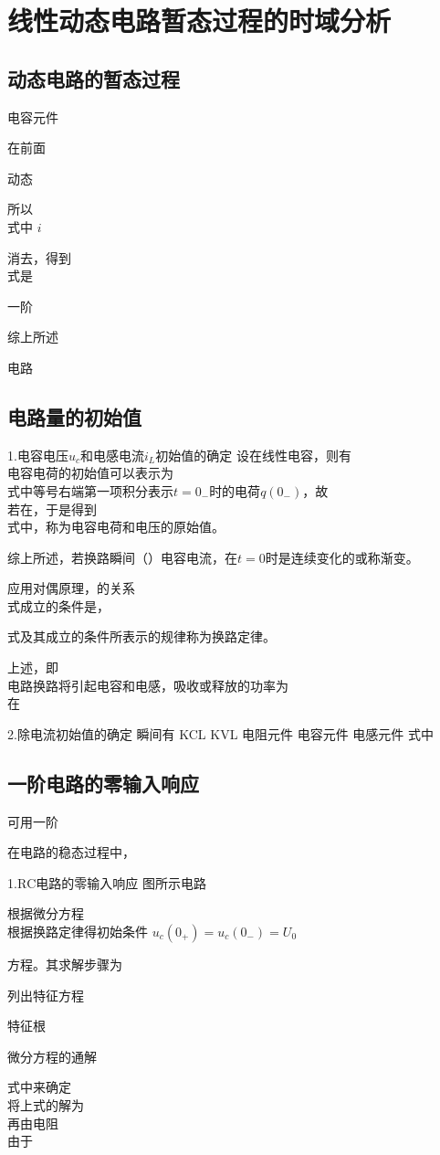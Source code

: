\chapter{线性动态电路暂态过程的时域分析}

\section{动态电路的暂态过程}
电容元件

在前面

动态

所以
\[
\]
式中    $i$

消去，得到
\[
\]
式是

一阶

综上所述

电路

\section{电路量的初始值}
1.电容电压$u_c$和电感电流$i_L$初始值的确定
设在线性电容，则有
\[
\]
电容电荷的初始值可以表示为
\[
\]
式中等号右端第一项积分表示$t=0_-$时的电荷$q(0_-)$，故
\[
\]
若在，于是得到
\[
\]
式中，称为电容电荷和电压的原始值。

综上所述，若换路瞬间（）电容电流，在$t=0$时是连续变化的或称渐变。

应用对偶原理，的关系
\[
\]
式成立的条件是，

式及其成立的条件所表示的规律称为换路定律。

上述，即
\[
\]
电路换路将引起电容和电感，吸收或释放的功率为
\[
\]
在

2.除电流初始值的确定
瞬间有
 KCL
 KVL
 电阻元件
 电容元件
 电感元件
式中

\section{一阶电路的零输入响应}
可用一阶

在电路的稳态过程中，

1.$\mathrm{RC}$电路的零输入响应
图所示电路

根据微分方程
\[
\]
根据换路定律得初始条件    $u_c(0_+)=u_c(0_-)=U_0$

方程。其求解步骤为

列出特征方程

特征根

微分方程的通解

式中来确定
\[
\]
将上式的解为
\[
\]
再由电阻
\[
\]
由于

